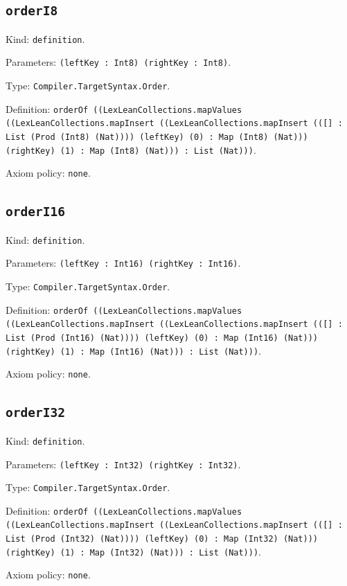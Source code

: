 \documentclass[11pt]{article}
\begin{document}
\subsection*{\texttt{orderI8}}
\noindent Kind: \texttt{definition}.\par
\noindent Parameters: \texttt{(leftKey : Int8) (rightKey : Int8)}.\par
\noindent Type: \texttt{Compiler.TargetSyntax.Order}.\par
\noindent Definition: \texttt{orderOf ((LexLeanCollections.mapValues ((LexLeanCollections.mapInsert ((LexLeanCollections.mapInsert (([] : List (Prod (Int8) (Nat)))) (leftKey) (0) : Map (Int8) (Nat))) (rightKey) (1) : Map (Int8) (Nat))) : List (Nat)))}.\par
\noindent Axiom policy: \texttt{none}.\par
\subsection*{\texttt{orderI16}}
\noindent Kind: \texttt{definition}.\par
\noindent Parameters: \texttt{(leftKey : Int16) (rightKey : Int16)}.\par
\noindent Type: \texttt{Compiler.TargetSyntax.Order}.\par
\noindent Definition: \texttt{orderOf ((LexLeanCollections.mapValues ((LexLeanCollections.mapInsert ((LexLeanCollections.mapInsert (([] : List (Prod (Int16) (Nat)))) (leftKey) (0) : Map (Int16) (Nat))) (rightKey) (1) : Map (Int16) (Nat))) : List (Nat)))}.\par
\noindent Axiom policy: \texttt{none}.\par
\subsection*{\texttt{orderI32}}
\noindent Kind: \texttt{definition}.\par
\noindent Parameters: \texttt{(leftKey : Int32) (rightKey : Int32)}.\par
\noindent Type: \texttt{Compiler.TargetSyntax.Order}.\par
\noindent Definition: \texttt{orderOf ((LexLeanCollections.mapValues ((LexLeanCollections.mapInsert ((LexLeanCollections.mapInsert (([] : List (Prod (Int32) (Nat)))) (leftKey) (0) : Map (Int32) (Nat))) (rightKey) (1) : Map (Int32) (Nat))) : List (Nat)))}.\par
\noindent Axiom policy: \texttt{none}.\par
\end{document}
